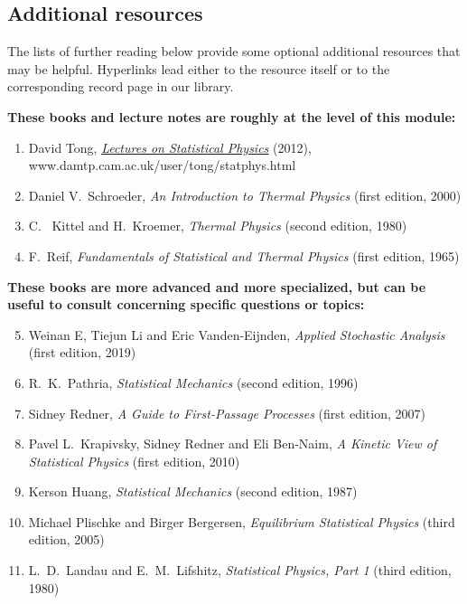 \subsection*{Additional resources}
The lists of further reading below provide some optional additional resources that may be helpful.
Hyperlinks lead either to the resource itself or to the corresponding record page in our library.

\noindent\textbf{These books and lecture notes are roughly at the level of this module:} \\[-24 pt]
\begin{enumerate}
  \item David Tong, \href{https://www.damtp.cam.ac.uk/user/tong/statphys.html}{\textit{Lectures on Statistical Physics}} (2012), \\ www.damtp.cam.ac.uk/user/tong/statphys.html
  \item Daniel V.~Schroeder, \textit{An Introduction to Thermal Physics} (first edition, 2000)
  \item C.~ Kittel and H.~Kroemer, \textit{Thermal Physics} (second edition, 1980)
  \item F.~Reif, \textit{Fundamentals of Statistical and Thermal Physics} (first edition, 1965)
\end{enumerate}

\noindent\textbf{These books are more advanced and more specialized, but can be useful to consult concerning specific questions or topics:} \\[-24 pt]
\begin{enumerate}
  \setcounter{enumi}{4}
  \item Weinan E, Tiejun Li and Eric Vanden-Eijnden, \textit{Applied Stochastic Analysis} (first edition, 2019)
  \item R.~K.~Pathria, \textit{Statistical Mechanics} (second edition, 1996)
  \item Sidney Redner, \textit{A Guide to First-Passage Processes} (first edition, 2007)
  \item Pavel L.~Krapivsky, Sidney Redner and Eli Ben-Naim, \textit{A Kinetic View of Statistical Physics} (first edition, 2010)
  \item Kerson Huang, \textit{Statistical Mechanics} (second edition, 1987)
  \item Michael Plischke and Birger Bergersen, \textit{Equilibrium Statistical Physics} (third edition, 2005)
  \item L.~D.~Landau and E.~M.~Lifshitz, \textit{Statistical Physics, Part 1} (third edition, 1980)
\end{enumerate}

